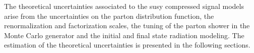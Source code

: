 The theoretical uncertainties associated to the \gls{susy} compressed signal
models arise from the uncertainties on the parton distribution function, the
renormalization and factorization scales, the tuning of the parton shower in the
Monte Carlo generator and the initial and final state radiation modeling. The
estimation of the theoretical uncertainties is presented in the following
sections.
